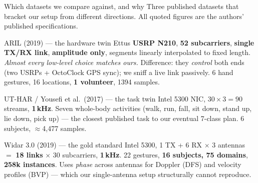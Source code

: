 \documentclass[aspectratio=169,10pt]{beamer}
\begin{document}
\begin{frame}{Which datasets we compare against, and why}
\footnotesize
Three published datasets that bracket our setup from different directions.
All quoted figures are the authors' published specifications.

\vspace{0.4em}
\begin{block}{\small ARIL (2019) --- the hardware twin}
\footnotesize Ettus \textbf{USRP N210}, \textbf{52 subcarriers}, \textbf{single TX/RX link},
\textbf{amplitude only}, segments linearly interpolated to fixed length.
\emph{Almost every low-level choice matches ours.} Difference: they \emph{control} both ends
(two USRPs + OctoClock GPS sync); we sniff a live link passively.
6 hand gestures, 16 locations, \textbf{1 volunteer}, 1394 samples.
\end{block}

\begin{block}{\small UT-HAR / Yousefi et al.\ (2017) --- the task twin}
\footnotesize Intel 5300 NIC, $30\times3=90$ streams, \textbf{1\,kHz}. Seven whole-body activities
(walk, run, fall, sit down, stand up, lie down, pick up) --- the closest published task to
our eventual 7-class plan. 6 subjects, $\approx$4{,}477 samples.
\end{block}

\begin{block}{\small Widar 3.0 (2019) --- the gold standard}
\footnotesize Intel 5300, 1 TX + 6 RX $\times$ 3 antennas $=$ \textbf{18 links} $\times$ 30 subcarriers,
\textbf{1\,kHz}. 22 gestures, \textbf{16 subjects, 75 domains}, \textbf{258k instances}.
Uses \emph{phase} across antennas for Doppler (DFS) and velocity profiles (BVP) ---
which our single-antenna setup structurally cannot reproduce.
\end{block}
\end{frame}
\end{document}
